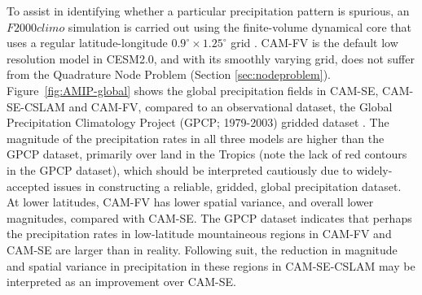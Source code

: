 \documentclass[twocol]{ametsoc}
\begin{document}
{\color{red}To assist in identifying whether a particular precipitation pattern is spurious, an $F2000climo$ simulation is carried out using the finite-volume dynamical core that uses a regular latitude-longitude $0.9^{\circ}\times 1.25^\circ$ grid \citep[CAM-FV; $f09$ grid; ][]{CAM5}. CAM-FV is the default low resolution model in CESM2.0, and with its smoothly varying grid, does not suffer from the Quadrature Node Problem (Section \ref{sec:nodeproblem}). Figure~\ref{fig:AMIP-global} shows the global precipitation fields in CAM-SE, CAM-SE-CSLAM and CAM-FV, compared to an observational dataset, the Global Precipitation Climatology Project (GPCP; 1979-2003) gridded dataset \citep{H2001JH}. The magnitude of the precipitation rates in all three models are higher than the GPCP dataset, primarily over land in the Tropics (note the lack of red contours in the GPCP dataset), which should be interpreted cautiously due to widely-accepted issues in constructing a reliable, gridded, global precipitation dataset. At lower latitudes, CAM-FV has lower spatial variance, and overall lower magnitudes, compared with CAM-SE. The GPCP dataset indicates that perhaps the precipitation rates in low-latitude mountaineous regions in CAM-FV and CAM-SE are larger than in reality. Following suit, the reduction in magnitude and spatial variance in precipitation in these regions in CAM-SE-CSLAM may be interpreted as an improvement over CAM-SE.{}} 
\end{document}
